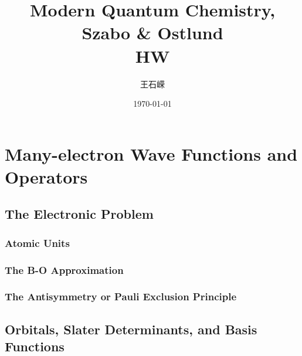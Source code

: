 \documentclass[a4paper]{article}
\title{\textbf{Modern Quantum Chemistry, Szabo \& Ostlund}\\HW}
\author{王石嵘
\vspace{5pt}\\
}
\date{\today} %
\numberwithin{equation}{subsection}
\begin{document}

\maketitle

\tableofcontents

\newpage

\setcounter{section}{1}
\section{Many-electron Wave Functions and Operators}
\subsection{The Electronic Problem}
\subsubsection{Atomic Units}
\subsubsection{The B-O Approximation}
\subsubsection{The Antisymmetry or Pauli Exclusion Principle}
\subsection{Orbitals, Slater Determinants, and Basis Functions}
\end{document}
